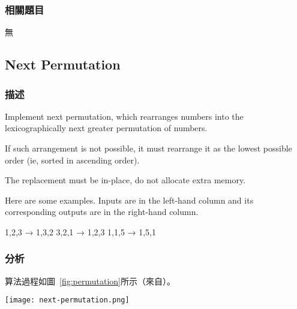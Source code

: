 \subsubsection{相關題目}
\begindot
\item 無
\myenddot


\subsection{Next Permutation} %
\label{sec:next-permutation}


\subsubsection{描述}
Implement next permutation, which rearranges numbers into the lexicographically next greater permutation of numbers.

If such arrangement is not possible, it must rearrange it as the lowest possible order (ie, sorted in ascending order).

The replacement must be in-place, do not allocate extra memory.

Here are some examples. Inputs are in the left-hand column and its corresponding outputs are in the right-hand column.
\begin{Code}
1,2,3 → 1,3,2
3,2,1 → 1,2,3
1,1,5 → 1,5,1
\end{Code}


\subsubsection{分析}
算法過程如圖~\ref{fig:permutation}所示（來自）。

\begin{center}
\texttt{[image: next-permutation.png]}\\
\label{fig:permutation}
\end{center}


